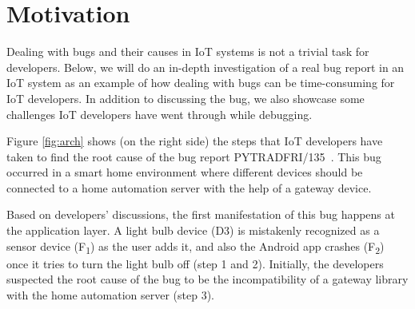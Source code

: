 \section{Motivation}

Dealing with bugs and their causes in IoT systems is not a trivial task for developers. Below, we will do an in-depth investigation of a real bug report in an IoT system as an example of how dealing with bugs can be time-consuming for IoT developers. In addition to discussing the bug, we also showcase some challenges IoT developers have went through while debugging. 

Figure \ref{fig:arch} shows (on the right side) the steps that IoT developers have taken to find the root cause of the bug report PYTRADFRI/135~\cite{iotbug:290}. This bug occurred in a smart home environment where different devices should be connected to a home automation server with the help of a gateway device.


Based on developers' discussions, the first manifestation of this bug happens at the application layer. A light bulb device (D3) is mistakenly recognized as a sensor device (F\textsubscript{1}) as the user adds it, and also the Android app crashes (F\textsubscript{2}) once it tries to turn the light bulb off (step 1 and 2). Initially, the developers suspected the root cause of the bug to be the incompatibility of a gateway library with the home automation server (step 3).


